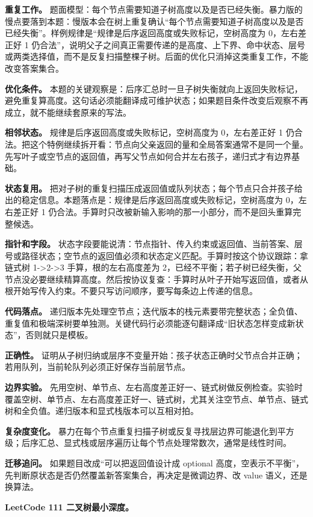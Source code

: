 \textbf{重复工作。} 题面模型：每个节点需要知道子树高度以及是否已经失衡。暴力版的慢点要落到本题：慢版本会在树上重复确认“每个节点需要知道子树高度以及是否已经失衡”。样例规律是“规律是后序返回高度或失败标记，空树高度为 0，左右差正好 1 仍合法”，说明父子之间真正需要传递的是高度、上下界、命中状态、层号或两类选择值，而不是反复扫描整棵子树。后面的优化只消掉这类重复工作，不能改变答案集合。

\textbf{优化条件。} 本题的关键观察是：后序汇总时一旦子树失衡就向上返回失败标记，避免重复算高度。这句话必须能翻译成可维护状态；如果题目条件改变后观察不再成立，就不能继续套原来的写法。

\textbf{相邻状态。} 规律是后序返回高度或失败标记，空树高度为 0，左右差正好 1 仍合法。把这个特例继续拆开看：节点向父亲返回的量和全局答案通常不是同一个量。先写叶子或空节点的返回值，再写父节点如何合并左右孩子，递归式才有边界基础。

\textbf{状态复用。} 把对子树的重复扫描压成返回值或队列状态；每个节点只合并孩子给出的稳定信息。本题落点是：规律是后序返回高度或失败标记，空树高度为 0，左右差正好 1 仍合法。手算时只改被新输入影响的那一小部分，而不是回头重算完整候选。

\textbf{指针和字段。} 状态字段要能说清：节点指针、传入约束或返回值、当前答案、层号或路径状态；空节点的返回值必须和状态定义匹配。手算时按这个协议跟踪：拿链式树 1->2->3 手算，根的左右高度差为 2，已经不平衡；若子树已经失衡，父节点没必要继续精算高度。然后按协议复查：手算时从叶子开始写返回值，或者从根开始写传入约束。不要只写访问顺序，要写每条边上传递的信息。

\textbf{代码落点。} 递归版本先处理空节点；迭代版本的栈元素要带完整状态；全负值、重复值和极端深树要单独测。关键代码行必须能逐句翻译成“旧状态怎样变成新状态”，否则就只是模板。

\textbf{正确性。} 证明从子树归纳或层序不变量开始：孩子状态正确时父节点合并正确；若用队列，当前轮队列必须正好保存当前层节点。

\textbf{边界实验。} 先用空树、单节点、左右高度差正好一、链式树做反例检查。实验时覆盖空树、单节点、左右高度差正好一、链式树，尤其关注空节点、单节点、链式树和全负值。递归版本和显式栈版本可以互相对拍。

\textbf{复杂度变化。} 暴力在每个节点重复扫描子树或反复寻找层边界可能退化到平方级；后序汇总、显式栈或层序遍历让每个节点处理常数次，通常是线性时间。

\textbf{迁移追问。} 如果题目改成“可以把返回值设计成 optional 高度，空表示不平衡”，先判断原状态是否仍然覆盖新答案集合，再决定是微调边界、改 value 语义，还是换算法。

\noindent\textbf{LeetCode 111 二叉树最小深度。}

